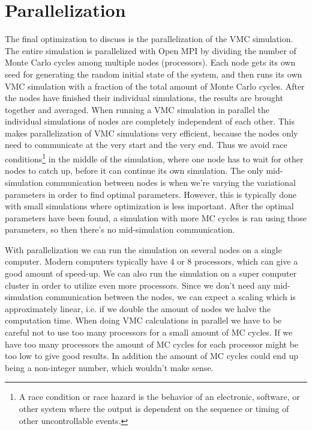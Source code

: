 \documentclass[../main.tex]{subfiles}
\begin{document}
\section{Parallelization}\label{sec:Parallel}

The final optimization to discuss is the parallelization of the VMC simulation. The entire simulation is parallelized with Open MPI by dividing the number of Monte Carlo cycles among multiple nodes (processors). Each node gets its own seed for generating the random initial state of the system, and then runs its own VMC simulation with a fraction of the total amount of Monte Carlo cycles. After the nodes have finished their individual simulations, the results are brought together and averaged. When running a VMC simulation in parallel the individual simulations of nodes are completely independent of each other. This makes parallelization of VMC simulations very efficient, because the nodes only need to communicate at the very start and the very end. Thus we avoid race conditions\footnote{A race condition or race hazard is the behavior of an electronic, software, or other system where the output is dependent on the sequence or timing of other uncontrollable events.\cite{race condition}} in the middle of the simulation, where one node has to wait for other nodes to catch up, before it can continue its own simulation. The only mid-simulation communication between nodes is when we're varying the variational parameters in order to find optimal parameters. However, this is typically done with small simulations where optimization is less important. After the optimal parameters have been found, a simulation with more MC cycles is ran using those parameters, so then there's no mid-simulation communication. 

With parallelization we can run the simulation on several nodes on a single computer. Modern computers typically have 4 or 8 processors, which can give a good amount of speed-up. We can also run the simulation on a super computer cluster in order to utilize even more processors. Since we don't need any mid-simulation communication between the nodes, we can expect a scaling which is approximately linear, i.e. if we double the amount of nodes we halve the computation time. When doing VMC calculations in parallel we have to be careful not to use too many processors for a small amount of MC cycles. If we have too many processors the amount of MC cycles for each processor might be too low to give good results. In addition the amount of MC cycles could end up being a non-integer number, which wouldn't make sense.
\end{document}
